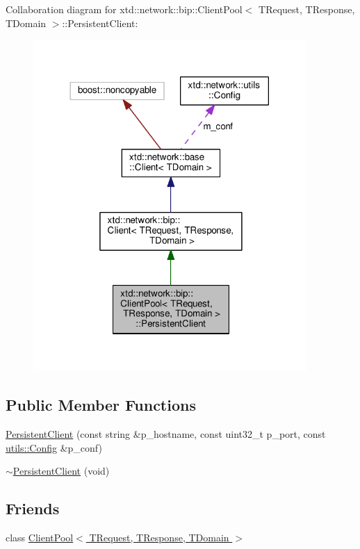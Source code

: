 Collaboration diagram for xtd\+:\+:network\+:\+:bip\+:\+:Client\+Pool$<$ T\+Request, T\+Response, T\+Domain $>$\+:\+:Persistent\+Client\+:
\nopagebreak
\begin{figure}[H]
\begin{center}
\leavevmode
\includegraphics[width=294pt]{classxtd_1_1network_1_1bip_1_1ClientPool_1_1PersistentClient__coll__graph}
\end{center}
\end{figure}
\subsection*{Public Member Functions}
\begin{DoxyCompactItemize}
\item 
\hyperlink{classxtd_1_1network_1_1bip_1_1ClientPool_1_1PersistentClient_ade4513087533d0807c995270804ffd86}{Persistent\+Client} (const string \&p\+\_\+hostname, const uint32\+\_\+t p\+\_\+port, const \hyperlink{classxtd_1_1network_1_1utils_1_1Config}{utils\+::\+Config} \&p\+\_\+conf)
\item 
\hyperlink{classxtd_1_1network_1_1bip_1_1ClientPool_1_1PersistentClient_af44e5c23cf33c46e79709200845f8abb}{$\sim$\+Persistent\+Client} (void)
\end{DoxyCompactItemize}
\subsection*{Friends}
\begin{DoxyCompactItemize}
\item 
class \hyperlink{classxtd_1_1network_1_1bip_1_1ClientPool_1_1PersistentClient_a3f5a2172b09497d719da36e7bac0eaf4}{Client\+Pool$<$ T\+Request, T\+Response, T\+Domain $>$}
\end{DoxyCompactItemize}
